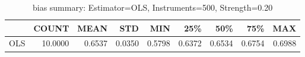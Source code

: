 \begin{table}[ht]
\centering
\caption{bias summary: Estimator=OLS, Instruments=500, Strength=0.20}
\begin{tabular}{lrrrrrrrr}
\toprule
 & COUNT & MEAN & STD & MIN & 25\% & 50\% & 75\% & MAX \\
\midrule
OLS & 10.0000 & 0.6537 & 0.0350 & 0.5798 & 0.6372 & 0.6534 & 0.6754 & 0.6988 \\
\bottomrule
\end{tabular}
\end{table}
